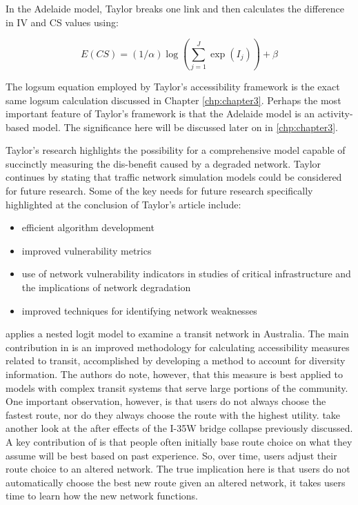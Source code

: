 In the Adelaide model, Taylor breaks one link and
then calculates the difference in IV and CS values using:

	\begin{equation}
		E(CS) = (1/\alpha) \log (\sum_{j = 1}^{J} \exp (I_j)) + \beta
			\label{eqn:taylor}
	\end{equation}

The logsum equation employed by Taylor's accessibility framework is the exact
same logsum calculation discussed in Chapter \ref{chp:chapter3}. Perhaps the
most important feature of Taylor's framework is that the Adelaide model is an
activity-based model. The significance here will be discussed later on in \ref{chp:chapter3}.

Taylor's research highlights the possibility for a comprehensive model capable
of succinctly measuring the dis-benefit caused by a degraded network.
Taylor continues by stating that traffic network simulation models
could be considered for future research. Some of the key needs for
future research specifically highlighted at the conclusion of Taylor's article include:

	\begin{itemize}
		\item efficient algorithm development
		\item improved vulnerability metrics
		\item use of network vulnerability indicators in studies of critical
		infrastructure and the implications of network degradation
		\item improved techniques for identifying network weaknesses
	\end{itemize}


\citet{Nassir2016} applies a nested logit model to examine a transit
network in Australia. The main contribution in \citet{Nassir2016} is an
improved methodology for calculating accessibility measures related to
transit, accomplished by developing a method to account for diversity
information. The authors do note, however, that this measure is best applied
to models with complex transit systems that serve large portions of the
community. One important observation, however, is that users do not always
choose the fastest route, nor do they always choose the route with the
highest utility. \citet{He2012} take another look at the after effects of
the I-35W bridge collapse previously discussed. A key contribution of
\citet{He2012} is that people often initially base route choice on what they
assume will be best based on past experience. So, over time, users
adjust their route choice to an altered network. The true implication here
is that users do not automatically choose the best new route given an
altered network, it takes users time to learn how the new network
functions.


